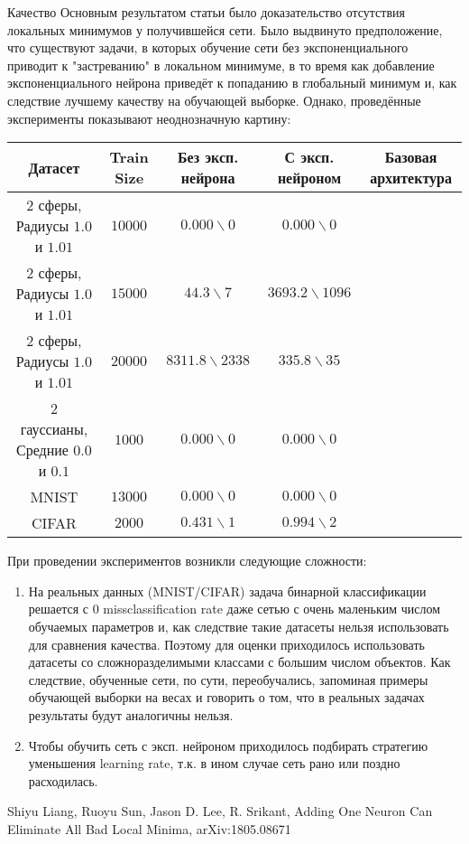 \documentclass[12pt,a4paper]{scrartcl}
\begin{document}
\begin{section}{Качество}
	Основным результатом статьи \cite{AddingOne} было доказательство отсутствия локальных минимумов у получившейся сети. Было выдвинуто предположение, что существуют задачи, в которых обучение сети без экспоненциального приводит к "застреванию" в локальном минимуме, в то время как добавление экспоненциального нейрона приведёт к попаданию в глобальный минимум и, как следствие лучшему качеству на обучающей выборке. Однако, проведённые эксперименты показывают неоднозначную картину:
	\begin{center}
		\begin{tabular}{c|c|c|c|c}
			Датасет & Train Size & Без эксп. нейрона & С эксп. нейроном & Базовая архитектура\\
			\hline
			2 сферы, Радиусы $1.0$ и $1.01$     & $10000$  & $0.000 \backslash 0$     & $0.000 \backslash 0$     & \\
			2 сферы, Радиусы $1.0$ и $1.01$     & $15000$  & $44.3 \backslash 7$      & $3693.2 \backslash 1096$ & \\
			2 сферы, Радиусы $1.0$ и $1.01$     & $20000$  & $8311.8 \backslash 2338$ & $335.8 \backslash 35$    & \\
			2 гауссианы, Средние $0.0$ и $0.1$  & $1000$   & $0.000 \backslash 0$     & $0.000 \backslash 0$     & \\
			MNIST                               & $13000$  & $0.000 \backslash 0$     & $0.000 \backslash 0$     & \\
			CIFAR                               & $2000$   & $0.431 \backslash 1$     & $0.994 \backslash 2$     & \\
		\end{tabular}
	\end{center}
	При проведении экспериментов возникли следующие сложности:
	\begin{enumerate}
		\item На реальных данных (MNIST/CIFAR) задача бинарной классификации решается с 0 missclassification rate даже сетью с очень маленьким числом обучаемых параметров и, как следствие такие датасеты нельзя использовать для сравнения качества. Поэтому для оценки приходилось использовать датасеты со сложноразделимыми классами с большим числом объектов. Как следствие, обученные сети, по сути, переобучались, запоминая примеры обучающей выборки на весах и говорить о том, что в реальных задачах результаты будут аналогичны нельзя.
		\item Чтобы обучить сеть с эксп. нейроном приходилось подбирать стратегию уменьшения learning rate, т.к. в ином случае сеть рано или поздно расходилась.
	\end{enumerate}
\end{section}

\begin{thebibliography}{9} 
	 Shiyu Liang, Ruoyu Sun, Jason D. Lee, R. Srikant, Adding One Neuron Can Eliminate All Bad Local Minima, arXiv:1805.08671
\end{thebibliography}
\end{document}
